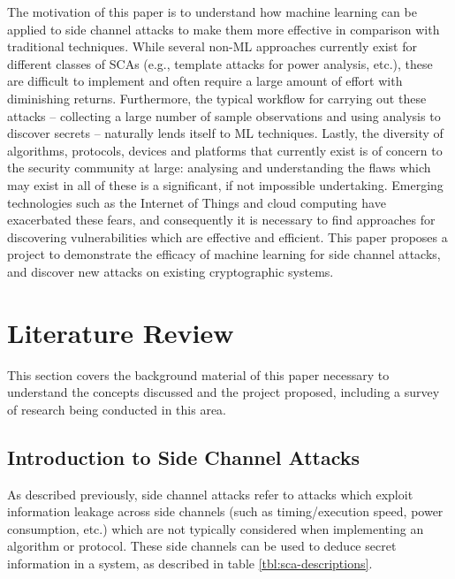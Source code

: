 \documentclass[a4paper,oneside,11pt]{article}
\begin{document}
The motivation of this paper is to understand how machine learning can be
applied to side channel attacks to make them more effective in comparison with
traditional techniques. While several non-ML approaches currently exist for
different classes of SCAs (e.g., template attacks for power analysis, etc.),
these are difficult to implement and often require a large amount of effort
with diminishing returns. Furthermore, the typical workflow for carrying out
these attacks -- collecting a large number of sample observations and using
analysis to discover secrets -- naturally lends itself to ML techniques.
Lastly, the diversity of algorithms, protocols, devices and platforms that
currently exist is of concern to the security community at large: analysing and
understanding the flaws which may exist in all of these is a significant, if
not impossible undertaking. Emerging technologies such as the Internet of
Things and cloud computing have exacerbated these fears, and consequently it is
necessary to find approaches for discovering vulnerabilities which are
effective and efficient. This paper proposes a project to demonstrate the
efficacy of machine learning for side channel attacks, and discover new attacks
on existing cryptographic systems.



\section{Literature Review}
\label{sec:literature-review}

This section covers the background material of this paper necessary to
understand the concepts discussed and the project proposed, including a survey
of research being conducted in this area.


\subsection{Introduction to Side Channel Attacks}
\label{sec:introduction-to-scas}

As described previously, side channel attacks refer to attacks which exploit
information leakage across side channels (such as timing/execution speed, power
consumption, etc.) which are not typically considered when implementing an
algorithm or protocol. These side channels can be used to deduce secret
information in a system, as described in table \ref{tbl:sca-descriptions}.
\end{document}
